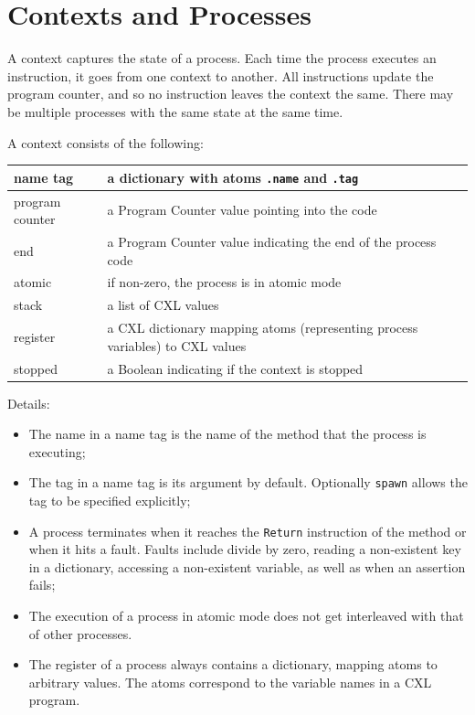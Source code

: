 \documentclass{report}
\begin{document}
\chapter{Contexts and Processes}
\label{app:context}

A context captures the state of a process.  Each time the process
executes an instruction, it goes from one context to another.
All instructions update the program counter, and so no instruction
leaves the context the same.
There may be multiple processes
with the same state at the same time.

A context consists of the following:

\vspace{1em}
\begin{tabular}{|l|l|}
\hline
name tag & a dictionary with atoms \texttt{.name} and \texttt{.tag} \\
\hline
program counter & a Program Counter value pointing into the code \\
\hline
end & a Program Counter value indicating the end of the process code \\
\hline
atomic & if non-zero, the process is in atomic mode \\
\hline
stack & a list of CXL values \\
\hline
register & a CXL dictionary mapping atoms (representing process variables) to CXL values \\
\hline
stopped & a Boolean indicating if the context is stopped \\
\hline
\end{tabular}
\vspace{1em}

Details:
\begin{itemize}
\item The name in a name tag is the name of the method that the process
is executing;
\item The tag in a name tag is its argument by default.  Optionally
\texttt{spawn} allows the tag to be specified explicitly;
\item A process terminates when it reaches the \texttt{Return} instruction
of the method or when it hits a fault.  Faults include divide by zero,
reading a non-existent key in a dictionary, accessing a non-existent
variable, as well as when an assertion fails;
\item The execution of a process in atomic mode does not get interleaved
with that of other processes.
\item The register of a process always contains a dictionary, mapping
atoms to arbitrary values.  The atoms correspond to the variable names
in a CXL program.
\end{itemize}
\end{document}
